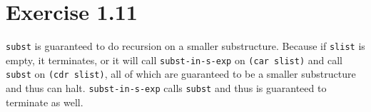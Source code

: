 \section*{Exercise 1.11}

\texttt{subst} is guaranteed to do recursion on a smaller substructure.
Because if \texttt{slist} is empty, it terminates, or it will call
\texttt{subst-in-s-exp} on \texttt{(car slist)} and call
\texttt{subst} on \texttt{(cdr slist)}, all of which are guaranteed to
be a smaller substructure and thus can halt.
\texttt{subst-in-s-exp} calls \texttt{subst} and thus is guaranteed to
terminate as well.
